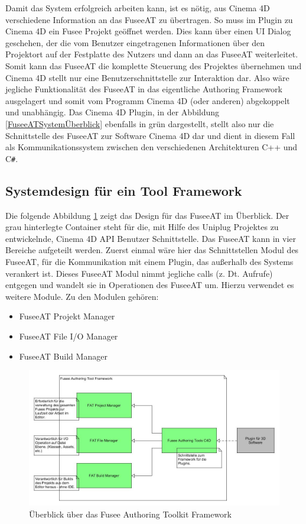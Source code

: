 \documentclass[pagesize, paper=a4, fontsize=12pt, titlepage=true, headings=small, headnosepline, abstractoff, liststotoc, nochapterprefix, plainheadsepline, twoside]{scrreprt}
\newcommand{\CS}{C\texttt{\#}}
\begin{document}
Damit das System erfolgreich arbeiten kann, ist es nötig, aus Cinema 4D verschiedene Information an das FuseeAT zu übertragen. So muss im Plugin zu Cinema 4D ein Fusee Projekt geöffnet werden. Dies kann über einen UI Dialog geschehen, der die vom Benutzer eingetragenen Informationen über den Projektort auf der Festplatte des Nutzers und dann an das FuseeAT weiterleitet. Somit kann das FuseeAT die komplette Steuerung des Projektes übernehmen und Cinema 4D stellt nur eine Benutzerschnittstelle zur Interaktion dar. Also wäre jegliche Funktionalität des FuseeAT in das eigentliche Authoring Framework ausgelagert und somit vom Programm Cinema 4D (oder anderen) abgekoppelt und unabhängig. Das Cinema 4D Plugin, in der Abbildung \ref{FuseeATSystemÜberblick} ebenfalls in grün dargestellt, stellt also nur die Schnittstelle des FuseeAT zur Software Cinema 4D dar und dient in diesem Fall als Kommunikationssystem zwischen den verschiedenen Architekturen C++ und \CS.

\subsection{Systemdesign für ein Tool Framework}
Die folgende Abbildung \ref{FrameworkÜberblick} zeigt das Design für das FuseeAT im Überblick. Der grau hinterlegte Container steht für die, mit Hilfe des Uniplug Projektes zu entwickelnde, Cinema 4D API Benutzer Schnittstelle. Das FuseeAT kann in vier Bereiche aufgeteilt werden. Zuerst einmal wäre hier das Schnittstellen Modul des FuseeAT, für die Kommunikation mit einem Plugin, das außerhalb des Systems verankert ist. Dieses FuseeAT Modul nimmt jegliche calls (z. Dt. Aufrufe) entgegen und wandelt sie in Operationen des FuseeAT um. Hierzu verwendet es weitere Module. Zu den Modulen gehören:
\begin{itemize}
\item FuseeAT Projekt Manager
\item FuseeAT File I/O Manager
\item FuseeAT Build Manager
\end{itemize}

\begin{figure}[ht]
	\centering
	\includegraphics[width=\linewidth]{Bilder/Ueberblick_Framework.jpg}
	\caption{Überblick über das Fusee Authoring Toolkit Framework}
	\label{FrameworkÜberblick}
\end{figure}
\end{document}
